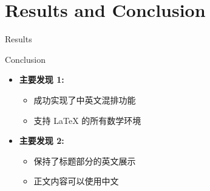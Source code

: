 \documentclass[aspectratio=169,12pt]{beamer}
\begin{document}
\section{Results and Conclusion}
\begin{frame}{Results}
    \begin{table}
        \caption{实验结果对比}
    \end{table}
\end{frame}

\begin{frame}{Conclusion}
    \begin{itemize}
        \item \textbf{主要发现 1:}
        \begin{itemize}
            \item 成功实现了中英文混排功能
            \item 支持 LaTeX 的所有数学环境
        \end{itemize}
        \item \textbf{主要发现 2:}
        \begin{itemize}
            \item 保持了标题部分的英文展示
            \item 正文内容可以使用中文
        \end{itemize}
    \end{itemize}
\end{frame}
\end{document}
